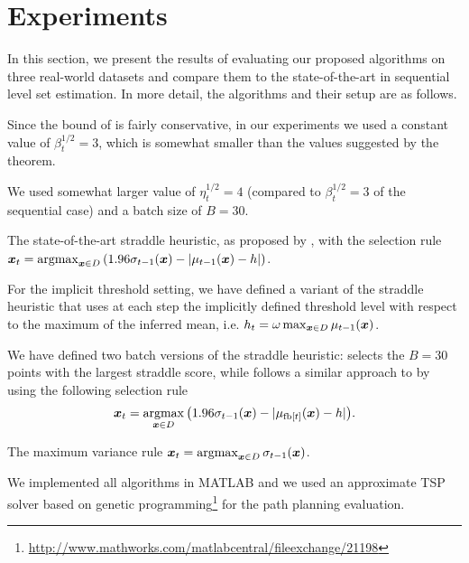 \chapter{Experiments} \label{ch:exp} 
In this section, we present the results of evaluating our proposed algorithms on
three real-world datasets and compare them to the state-of-the-art in sequential
level set estimation.
In more detail, the algorithms and their setup are as follows.
\begin{description}[labelindent=0pt,leftmargin=7pt,itemindent=-2pt,itemsep=0pt]
\item[\acl/\iacl:] Since the bound of  is fairly conservative,
  in our experiments we used a constant value of $\beta_t^{1/2} = 3$, which is
  somewhat smaller than the values suggested by the theorem.
\item[\bacl/\ibacl:] We used somewhat larger value of $\eta_t^{1/2} = 4$ (compared
  to $\beta_t^{1/2}=3$ of the sequential case) and a batch size of $B = 30$.
\item[\str:] The state-of-the-art straddle heuristic,
  as proposed by \citet{bryan05}, with the selection rule
  ${\*x_t = \argmax_{\*x \in D} \left(1.96\sigma_{t-1}(\*x) - |\mu_{t-1}(\*x) - h|\right)}$.
\item[\istr:] For the implicit threshold setting, we have defined a
  variant of the straddle heuristic that uses at each step the
  implicitly defined threshold level with respect to the maximum of the
  inferred mean, i.e.
  ${h_t = \omega \max_{\bm{x}\in D} \mu_{t-1}(\bm{x})}$.
\item[\rstr/\bstr:] We have defined two batch versions of the straddle heuristic:
  \rstr selects the $B = 30$ points with
  the largest straddle score, while \bstr follows a similar approach to \bacl
  by using the following selection rule
  \begin{align*}
  {\*x_t = \argmax_{\*x \in D}\left(1.96\sigma_{t-1}(\*x) - |\mu_{\fb[t]}(\*x) - h|\right)}.
  \end{align*}
\item[\var:]  The maximum variance rule
  $\*x_t = \argmax_{\*x \in D} \sigma_{t-1}(\*x)$.
\end{description}

We implemented all algorithms in MATLAB and we used an approximate TSP
solver based on genetic
programming\footnote{\url{http://www.mathworks.com/matlabcentral/fileexchange/21198}}
for the path planning evaluation.

